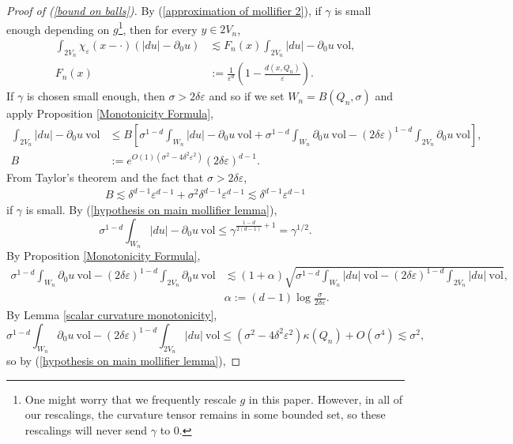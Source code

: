 \documentclass[reqno,12pt,letterpaper]{amsart}
\newcommand{\vol}{\mathrm{vol}}
\theoremstyle{definition}
\numberwithin{equation}{section}
\begin{document}
\begin{proof}[Proof of (\ref{bound on balls})]
By (\ref{approximation of mollifier 2}), if $\gamma$ is small enough depending on $g$\footnote{One might worry that we frequently rescale $g$ in this paper.
However, in all of our rescalings, the curvature tensor remains in some bounded set, so these rescalings will never send $\gamma$ to $0$.}, then for every $y \in 2V_n$,
\begin{align*}
\int_{2V_n} \chi_\varepsilon(x - \cdot)(|du| - \partial_0u) &\lesssim F_n(x) \int_{2V_n} |du| - \partial_0u ~\vol, \\
F_n(x) &:= \frac{1}{\varepsilon^d}\left(1 - \frac{d(x, Q_n)}{\varepsilon}\right).
\end{align*}
If $\gamma$ is chosen small enough, then $\sigma > 2\delta\varepsilon$ and so if we set $W_n = B(Q_n, \sigma)$ and apply Proposition \ref{Monotonicity Formula},
\begin{align*}
\int_{2V_n}|du| - \partial_0u ~\vol &\leq
B \left[\sigma^{1 - d}\int_{W_n} |du| - \partial_0u ~\vol + \sigma^{1 - d}\int_{W_n} \partial_0u ~\vol - (2\delta\varepsilon)^{1 - d}\int_{2V_n} \partial_0u ~\vol \right],\\
B &:= e^{O(1)(\sigma^2 - 4\delta^2\varepsilon^2)}(2\delta\varepsilon)^{d - 1}.
\end{align*}
From Taylor's theorem and the fact that $\sigma > 2\delta\varepsilon$,
\begin{align*}
B \lesssim \delta^{d - 1} \varepsilon^{d - 1} + \sigma^2 \delta^{d - 1} \varepsilon^{d - 1} \lesssim \delta^{d - 1} \varepsilon^{d - 1}
\end{align*}
if $\gamma$ is small.
By (\ref{hypothesis on main mollifier lemma}),
$$\sigma^{1 - d}\int_{W_n} |du| - \partial_0u ~\vol \leq \gamma^{\frac{1 - d}{2(d - 1)} + 1} = \gamma^{1/2}.$$
By Proposition \ref{Monotonicity Formula},
\begin{align*}
\sigma^{1 - d}\int_{W_n} \partial_0u ~\vol - (2\delta\varepsilon)^{1 - d}\int_{2V_n} \partial_0u ~\vol &\lesssim (1 + \alpha)\sqrt{\sigma^{1 - d} \int_{W_n} |du| ~\vol - (2\delta\varepsilon)^{1 - d} \int_{2V_n} |du| ~\vol},\\
&\alpha := (d - 1)\log \frac{\sigma}{2\delta\varepsilon}.
\end{align*}
By Lemma \ref{scalar curvature monotonicity},
$$\sigma^{1 - d} \int_{W_n} \partial_0 u ~\vol - (2\delta\varepsilon)^{1 - d} \int_{2V_n} |du| ~\vol \leq (\sigma^2 -4\delta^2\varepsilon^2) \kappa(Q_n) + O(\sigma^4) \lesssim \sigma^2,$$
so by (\ref{hypothesis on main mollifier lemma}),

\end{proof}
\end{document}

